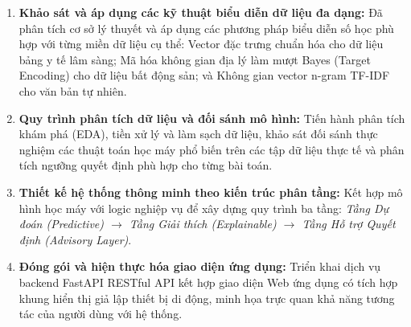 \documentclass[12pt,a4paper]{report}
\begin{document}
\begin{enumerate}[leftmargin=2em]
    \item \textbf{Khảo sát và áp dụng các kỹ thuật biểu diễn dữ liệu đa dạng:} Đã phân tích cơ sở lý thuyết và áp dụng các phương pháp biểu diễn số học phù hợp với từng miền dữ liệu cụ thể: Vector đặc trưng chuẩn hóa cho dữ liệu bảng y tế lâm sàng; Mã hóa không gian địa lý làm mượt Bayes (Target Encoding) cho dữ liệu bất động sản; và Không gian vector n-gram TF-IDF cho văn bản tự nhiên.
    \item \textbf{Quy trình phân tích dữ liệu và đối sánh mô hình:} Tiến hành phân tích khám phá (EDA), tiền xử lý và làm sạch dữ liệu, khảo sát đối sánh thực nghiệm các thuật toán học máy phổ biến trên các tập dữ liệu thực tế và phân tích ngưỡng quyết định phù hợp cho từng bài toán.
    \item \textbf{Thiết kế hệ thống thông minh theo kiến trúc phân tầng:} Kết hợp mô hình học máy với logic nghiệp vụ để xây dựng quy trình ba tầng: \textit{Tầng Dự đoán (Predictive) $\rightarrow$ Tầng Giải thích (Explainable) $\rightarrow$ Tầng Hỗ trợ Quyết định (Advisory Layer)}.
    \item \textbf{Đóng gói và hiện thực hóa giao diện ứng dụng:} Triển khai dịch vụ backend FastAPI RESTful API kết hợp giao diện Web ứng dụng có tích hợp khung hiển thị giả lập thiết bị di động, minh họa trực quan khả năng tương tác của người dùng với hệ thống.
\end{enumerate}
\end{document}
